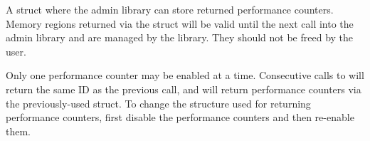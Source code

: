 A struct where the admin library can store returned performance counters.
Memory regions returned via the struct will be valid until the next call into
the admin library and are managed by the library.  They should not be freed by
the user.

Only one performance counter may be enabled at a time.  Consecutive calls to
 will return the same ID as the previous call, and
will return performance counters via the previously-used struct.  To change the
structure used for returning performance counters, first disable the performance
counters and then re-enable them.
